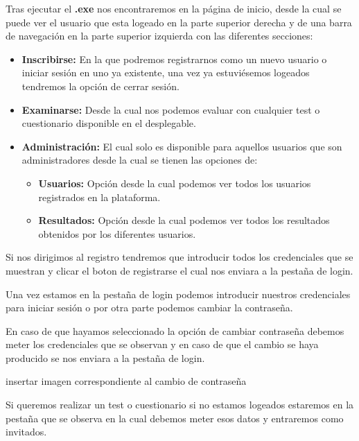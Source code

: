 Tras ejecutar el \textbf{.exe} nos encontraremos en la página de inicio, desde la cual se puede ver el usuario que esta logeado en la parte superior derecha y de una barra de navegación en la parte superior izquierda con las diferentes secciones:
\begin{itemize}
    \item \textbf{Inscribirse:} En la que podremos registrarnos como un nuevo usuario o iniciar sesión en uno ya existente, una vez ya estuviésemos logeados tendremos la opción de cerrar sesión.
    \item \textbf{Examinarse:} Desde la cual nos podemos evaluar con cualquier test o cuestionario disponible en el desplegable.
    \item \textbf{Administración:} El cual solo es disponible para aquellos usuarios que son administradores desde la cual se tienen las opciones de:
    \begin{itemize}
        \item \textbf{Usuarios:} Opción desde la cual podemos ver todos los usuarios registrados en la plataforma.
        \item \textbf{Resultados:} Opción desde la cual podemos ver todos los resultados obtenidos por los diferentes usuarios.
    \end{itemize}
\end{itemize}

Si nos dirigimos al registro tendremos que introducir todos los credenciales que se muestran y clicar el boton de registrarse el cual nos enviara a la pestaña de login.


Una vez estamos en la pestaña de login podemos introducir nuestros credenciales para iniciar sesión o por otra parte podemos cambiar la contraseña.


En caso de que hayamos seleccionado la opción de cambiar contraseña debemos meter los credenciales que se observan y en caso de que el cambio se haya producido se nos enviara a la pestaña de login.

insertar imagen correspondiente al cambio de contraseña

Si queremos realizar un test o cuestionario si no estamos logeados estaremos en la pestaña que se observa en la cual debemos meter esos datos y entraremos como invitados.

